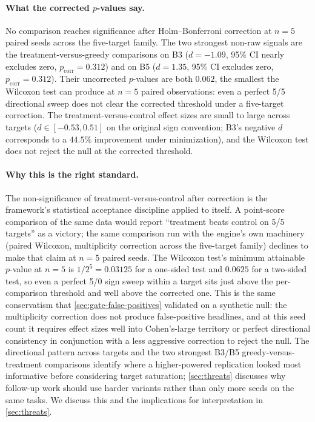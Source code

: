 \paragraph{What the corrected $p$-values say.}
No comparison reaches significance after Holm--Bonferroni correction at $n = 5$ paired seeds across the five-target family.
The two strongest non-raw signals are the treatment-versus-greedy comparisons on B3 ($d = -1.09$, 95\% CI nearly excludes zero, $p_{\text{corr}} = 0.312$) and on B5 ($d = 1.35$, 95\% CI excludes zero, $p_{\text{corr}} = 0.312$).
Their uncorrected $p$-values are both $0.062$, the smallest the Wilcoxon test can produce at $n = 5$ paired observations: even a perfect 5/5 directional sweep does not clear the corrected threshold under a five-target correction.
The treatment-versus-control effect sizes are small to large across targets ($d \in [-0.53, 0.51]$ on the original sign convention; B3's negative $d$ corresponds to a $44.5\%$ improvement under minimization), and the Wilcoxon test does not reject the null at the corrected threshold.

\paragraph{Why this is the right standard.}
The non-significance of treatment-versus-control after correction is the framework's statistical acceptance discipline applied to itself.
A point-score comparison of the same data would report ``treatment beats control on 5/5 targets'' as a victory; the same comparison run with the engine's own machinery (paired Wilcoxon, multiplicity correction across the five-target family) declines to make that claim at $n = 5$ paired seeds.
The Wilcoxon test's minimum attainable $p$-value at $n = 5$ is $1/2^5 = 0.03125$ for a one-sided test and $0.0625$ for a two-sided test, so even a perfect 5/0 sign sweep within a target sits just above the per-comparison threshold and well above the corrected one.
This is the same conservatism that \cref{sec:gate-false-positives} validated on a synthetic null: the multiplicity correction does not produce false-positive headlines, and at this seed count it requires effect sizes well into Cohen's-large territory or perfect directional consistency in conjunction with a less aggressive correction to reject the null.
The directional pattern across targets and the two strongest B3/B5 greedy-versus-treatment comparisons identify where a higher-powered replication looked most informative before considering target saturation; \cref{sec:threats} discusses why follow-up work should use harder variants rather than only more seeds on the same tasks.
We discuss this and the implications for interpretation in \cref{sec:threats}.

